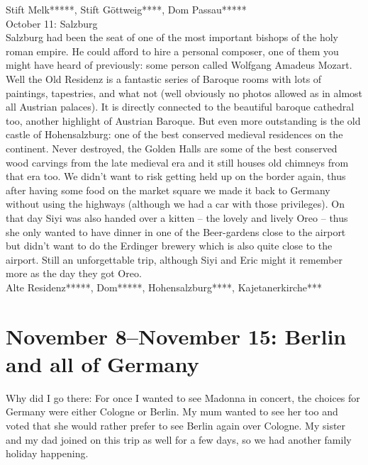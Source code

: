Stift Melk*****, Stift G\"ottweig****, Dom Passau*****\\

October 11: Salzburg\\
Salzburg had been the seat of one of the most important bishops of the holy roman empire. He could afford to hire a personal composer, one of them you might have heard of previously: some person called Wolfgang Amadeus Mozart. Well the Old Residenz is a fantastic series of Baroque rooms with lots of paintings, tapestries, and what not (well obviously no photos allowed as in almost all Austrian palaces). It is directly connected to the beautiful baroque cathedral too, another highlight of Austrian Baroque. But even more outstanding is the old castle of Hohensalzburg: one of the best conserved medieval residences on the continent. Never destroyed, the Golden Halls are some of the best conserved wood carvings from the late medieval era and it still houses old chimneys from that era too. We didn't want to risk getting held up on the border again, thus after having some food on the market square we made it back to Germany without using the highways (although we had a car with those privileges). On that day Siyi was also handed over a kitten -- the lovely and lively Oreo -- thus she only wanted to have dinner in one of the Beer-gardens close to the airport but didn't want to do the Erdinger brewery which is also quite close to the airport. Still an unforgettable trip, although Siyi and Eric might it remember more as the day they got Oreo.\\

Alte Residenz*****, Dom*****, Hohensalzburg****, Kajetanerkirche***

\section{November 8--November 15: Berlin and all of Germany}
\label{2015:Berlin}

Why did I go there: For once I wanted to see Madonna in concert, the choices for Germany were either Cologne or Berlin. My mum wanted to see her too and voted that she would rather prefer to see Berlin again over Cologne. My sister and my dad joined on this trip as well for a few days, so we had another family holiday happening.\\

